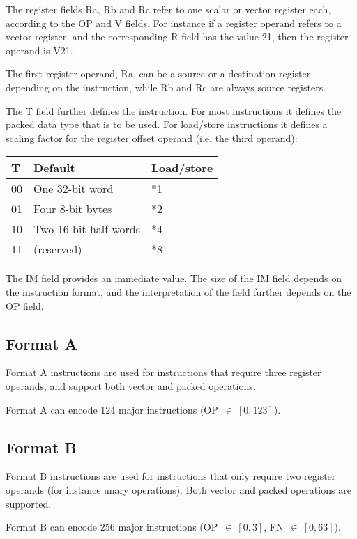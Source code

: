 The register fields Ra, Rb and Rc refer to one scalar or vector register each,
according to the OP and V fields. For instance if a register operand refers to
a vector register, and the corresponding R-field has the value 21, then the
register operand is V21.

The first register operand, Ra, can be a source or a destination register
depending on the instruction, while Rb and Rc are always source registers.

The T field further defines the instruction. For most instructions it defines
the packed data type that is to be used. For load/store instructions it
defines a scaling factor for the register offset operand (i.e. the third
operand):

\begin{tabular}{|l|l|l|}
  \hline
  \textbf{T} & \textbf{Default} & \textbf{Load/store} \\
  \hline
  00 & One 32-bit word & *1 \\
  \hline
  01 & Four 8-bit bytes & *2 \\
  \hline
  10 & Two 16-bit half-words & *4 \\
  \hline
  11 & (reserved) & *8 \\
  \hline
\end{tabular}

The IM field provides an immediate value. The size of the IM field depends on
the instruction format, and the interpretation of the field further depends on
the OP field.

\subsection{Format A}

Format A instructions are used for instructions that require three register
operands, and support both vector and packed operations.

Format A can encode 124 major instructions (OP~$\in~[0,123]$).

\subsection{Format B}

Format B instructions are used for instructions that only require two register
operands (for instance unary operations). Both vector and packed operations are
supported.

Format B can encode 256 major instructions (OP~$\in~[0,3]$, FN~$\in~[0,63]$).

